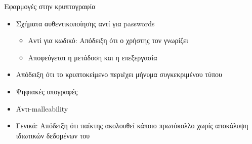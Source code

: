 \documentclass[handout]{beamer}
\begin{document}
\begin{frame}{Εφαρμογές στην κρυπτογραφία}
\begin{itemize}
\item Σχήματα αυθεντικοποίησης αντί για passwords
\begin{itemize}
\item Αντί για κωδικό: Απόδειξη ότι ο χρήστης τον γνωρίζει
\item Αποφεύγεται η μετάδοση και η επεξεργασία
\end{itemize}
\pause
\item Απόδειξη ότι το κρυπτοκείμενο περιέχει μήνυμα συγκεκριμένου τύπου
\pause
\item Ψηφιακές υπογραφές
\item Άντι-malleability
\pause 
\item Γενικά: Απόδειξη ότι παίκτης ακολουθεί κάποιο πρωτόκολλο χωρίς αποκάλυψη ιδιωτικών δεδομένων του
\end{itemize}
\end{frame}
\end{document}
